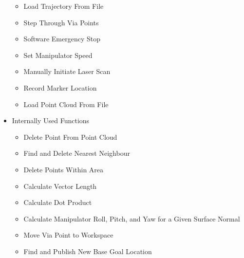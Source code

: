 \begin{itemize}
\begin{itemize}
\item Load Trajectory From File
\item Step Through Via Points
\item Software Emergency Stop
\item Set Manipulator Speed
\item Manually Initiate Laser Scan
\item Record Marker Location
\item Load Point Cloud From File
\end{itemize}
\item Internally Used Functions
\begin{itemize}
\item Delete Point From Point Cloud
\item Find and Delete Nearest Neighbour
\item Delete Points Within Area
\item Calculate Vector Length
\item Calculate Dot Product
\item Calculate Manipulator Roll, Pitch, and Yaw for a Given Surface Normal
\item Move Via Point to Workspace
\item Find and Publish New Base Goal Location
\end{itemize}
\end{itemize}
